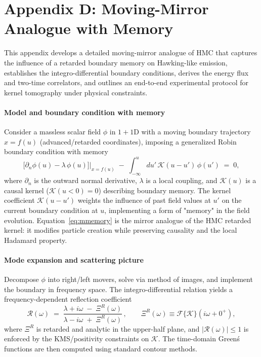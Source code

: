 \documentclass[a4paper,11pt]{article}
\newcommand{\HMC}{\textup{\textsc{HMC}}\xspace}
\theoremstyle{plain}
\theoremstyle{definition}
\theoremstyle{remark}
\begin{document}
\section{Appendix D: Moving-Mirror Analogue with Memory}
\label{app:moving_mirror}
This appendix develops a detailed moving-mirror analogue of \HMC{} that captures the influence of a retarded boundary memory on Hawking-like emission, establishes the integro-differential boundary conditions, derives the energy flux and two-time correlators, and outlines an end-to-end experimental protocol for kernel tomography under physical constraints.

\paragraph{Model and boundary condition with memory}
Consider a massless scalar field $\phi$ in $1+1$D with a moving boundary trajectory $x=f(u)$ (advanced/retarded coordinates), imposing a generalized Robin boundary condition with memory
\begin{equation}
\left.\Big[\partial_n \phi(u)-\lambda\,\phi(u)\Big]\right|_{x=f(u)}\;-\;\int_{-\infty}^u du'\,\mathcal{K}(u-u')\,\phi(u')\;=\;0,
\label{eq:mmemory}
\end{equation}
where $\partial_n$ is the outward normal derivative, $\lambda$ is a local coupling, and $\mathcal{K}(u)$ is a causal kernel ($\mathcal{K}(u<0)=0$) describing boundary memory. The kernel coefficient $\mathcal{K}(u-u')$ weights the influence of past field values at $u'$ on the current boundary condition at $u$, implementing a form of "memory" in the field evolution. Equation~\eqref{eq:mmemory} is the mirror analogue of the \HMC{} retarded kernel: it modifies particle creation while preserving causality and the local Hadamard property.

\paragraph{Mode expansion and scattering picture}
Decompose $\phi$ into right/left movers, solve via method of images, and implement the boundary in frequency space. The integro-differential relation yields a frequency-dependent reflection coefficient
\begin{equation}
\mathcal{R}(\omega)\;=\;\frac{\lambda+i\omega\;-\;\Xi^R(\omega)}{\lambda-i\omega\;+\;\Xi^R(\omega)}\,,
\qquad \Xi^R(\omega)\equiv \mathcal{F}\{\mathcal{K}\}(i\omega+0^+),
\end{equation}
where $\Xi^R$ is retarded and analytic in the upper-half plane, and $|\mathcal{R}(\omega)|\le 1$ is enforced by the KMS/positivity constraints on $\mathcal{K}$. The time-domain Green\'s functions are then computed using standard contour methods.
\end{document}
